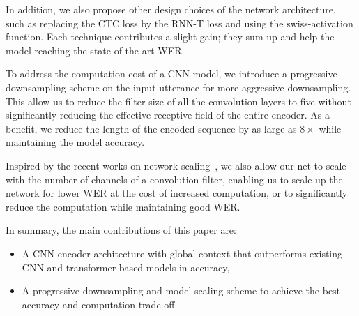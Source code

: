 In addition, we also propose other design choices of the network architecture, such as replacing the CTC loss by the RNN-T loss\cite{graves2012sequence} and using the swiss-activation function\cite{ramachandran2017searching}. Each technique contributes a slight gain; they sum up and help the model reaching the state-of-the-art WER.

To address the computation cost of a CNN model, we introduce a progressive downsampling scheme on the input utterance for more aggressive downsampling. This allow us to reduce the filter size of all the convolution layers to five without significantly reducing the effective receptive field of the entire encoder. As a benefit, we reduce the length of the encoded sequence by as large as $8\times$ while maintaining the model accuracy.

Inspired by the recent works on network scaling~\cite{tan2019efficientnet}, we also allow our net to scale with the number of channels of a convolution filter, enabling us to scale up the network for lower WER at the cost of increased computation, or to significantly reduce the computation while maintaining good WER.

In summary, the main contributions of this paper are:
\begin{itemize}
    \item A CNN encoder architecture with global context that outperforms existing CNN and transformer based models in accuracy,
    \item A progressive downsampling and model scaling scheme to achieve the best accuracy and computation trade-off.
\end{itemize}

